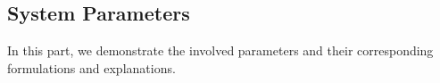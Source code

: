 \documentclass[runningheads,a4paper]{llncs}
\begin{document}



\subsection{System Parameters}
In this part, we demonstrate the involved parameters and their
corresponding formulations and explanations.
\end{document}
